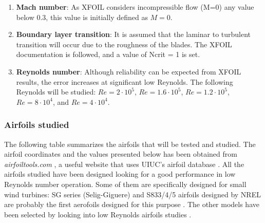 \documentclass[../TFG_Report.tex]{subfiles}
\begin{document}
\begin{enumerate}
	\item \textbf{Mach number}: As XFOIL considers incompressible flow (M=0) any value below 0.3, this value is initially defined as $M=0$.
	
	\item \textbf{Boundary layer transition}: It is assumed that the laminar to turbulent transition will occur due to the roughness of the blades. The XFOIL documentation is followed, and a value of Ncrit = 1 is set. \cite{XFOIL} 
		 
	\item \textbf{Reynolds number}: Although reliability can be expected from XFOIL results, the error increases at significant low Reynolds. The following Reynolds will be studied: $Re=2\cdot10^5$, $Re=1.6\cdot10^5$, $Re=1.2\cdot10^5$, $Re=8\cdot10^4$, and $Re=4\cdot10^4$.
\end{enumerate}




\subsubsection*{Airfoils studied}

The following table summarizes the airfoils that will be tested and studied. The airfoil coordinates and the values presented below has been obtained from \textit{airfoiltools.com} \cite{Airfoiltools}, a useful website that uses UIUC's airfoil database \cite{UIUC}. All the airfoils studied have been designed looking for a good performance in low Reynolds number operation. Some of them are specifically designed for small wind turbines: SG series (Selig-Giguere) and S833/4/5 airfoils designed by NREL are probably the first aerofoils designed for this purpose \cite{Wood}. The other models have been selected by looking into low Reynolds airfoils studies \cite{fuentes2016airfoil} \cite{shah2012low}.  
\end{document}
